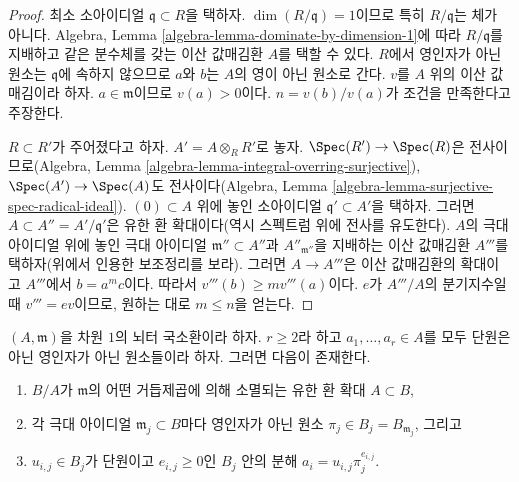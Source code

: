 \begin{proof}
최소 소아이디얼 $\mathfrak q \subset R$을 택하자.
$\dim(R/\mathfrak q) = 1$이므로 특히 $R/\mathfrak q$는 체가 아니다.
Algebra, Lemma \ref{algebra-lemma-dominate-by-dimension-1}에 따라
$R/\mathfrak q$를 지배하고 같은 분수체를 갖는 이산 값매김환 $A$를
택할 수 있다. $R$에서 영인자가 아닌 원소는 $\mathfrak q$에 속하지
않으므로 $a$와 $b$는 $A$의 영이 아닌 원소로 간다. $v$를 $A$ 위의
이산 값매김이라 하자. $a \in \mathfrak m$이므로 $v(a) > 0$이다.
$n = v(b)/v(a)$가 조건을 만족한다고 주장한다.

\medskip\noindent
$R \subset R'$가 주어졌다고 하자. $A' = A \otimes_R R'$로 놓자.
$\Spec(R') \to \Spec(R)$은 전사이므로(Algebra, Lemma
\ref{algebra-lemma-integral-overring-surjective}),
$\Spec(A') \to \Spec(A)$도 전사이다(Algebra, Lemma
\ref{algebra-lemma-surjective-spec-radical-ideal}). $(0) \subset A$ 위에
놓인 소아이디얼 $\mathfrak q' \subset A'$을 택하자. 그러면
$A \subset A'' = A'/\mathfrak q'$은 유한 환 확대이다(역시 스펙트럼
위에 전사를 유도한다). $A$의 극대 아이디얼 위에 놓인 극대 아이디얼
$\mathfrak m'' \subset A''$과 $A''_{\mathfrak m''}$을 지배하는 이산
값매김환 $A'''$를 택하자(위에서 인용한 보조정리를 보라). 그러면
$A \to A'''$은 이산 값매김환의 확대이고 $A'''$에서 $b = a^m c$이다.
따라서 $v'''(b) \geq mv'''(a)$이다. $e$가 $A'''/A$의 분기지수일 때
$v''' = ev$이므로, 원하는 대로 $m \leq n$을 얻는다.
\end{proof}
\begin{lemma}
\label{lemma-prepare-tame-symbol}
$(A, \mathfrak m)$을 차원 $1$의 뇌터 국소환이라 하자.
$r \geq 2$라 하고 $a_1, \ldots, a_r \in A$를 모두 단원은 아닌
영인자가 아닌 원소들이라 하자. 그러면 다음이 존재한다.
\begin{enumerate}
\item $B/A$가 $\mathfrak m$의 어떤 거듭제곱에 의해 소멸되는 유한
환 확대 $A \subset B$,
\item 각 극대 아이디얼 $\mathfrak m_j \subset B$마다 영인자가 아닌
원소 $\pi_j \in B_j = B_{\mathfrak m_j}$, 그리고
\item $u_{i, j} \in B_j$가 단원이고 $e_{i, j} \geq 0$인 $B_j$ 안의 분해
$a_i = u_{i, j} \pi_j^{e_{i, j}}$.
\end{enumerate}
\end{lemma}

